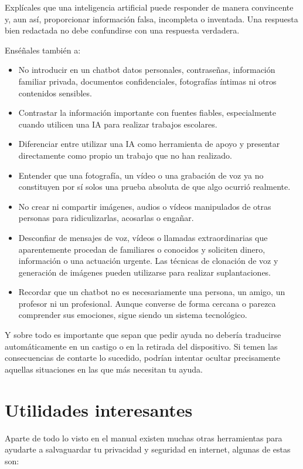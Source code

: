 \documentclass[
  spanish,
  a4paper,
  openany]{book}
\begin{document}
Explícales que una inteligencia artificial puede responder de manera convincente y, aun así, proporcionar información falsa, incompleta o inventada. Una respuesta bien redactada no debe confundirse con una respuesta verdadera.

Enséñales también a:

\begin{itemize}
\item
  No introducir en un chatbot datos personales, contraseñas, información familiar privada, documentos confidenciales, fotografías íntimas ni otros contenidos sensibles.
\item
  Contrastar la información importante con fuentes fiables, especialmente cuando utilicen una IA para realizar trabajos escolares.
\item
  Diferenciar entre utilizar una IA como herramienta de apoyo y presentar directamente como propio un trabajo que no han realizado.
\item
  Entender que una fotografía, un vídeo o una grabación de voz ya no constituyen por sí solos una prueba absoluta de que algo ocurrió realmente.
\item
  No crear ni compartir imágenes, audios o vídeos manipulados de otras personas para ridiculizarlas, acosarlas o engañar.
\item
  Desconfiar de mensajes de voz, vídeos o llamadas extraordinarias que aparentemente procedan de familiares o conocidos y soliciten dinero, información o una actuación urgente. Las técnicas de clonación de voz y generación de imágenes pueden utilizarse para realizar suplantaciones.
\item
  Recordar que un chatbot no es necesariamente una persona, un amigo, un profesor ni un profesional. Aunque converse de forma cercana o parezca comprender sus emociones, sigue siendo un sistema tecnológico.
\end{itemize}

Y sobre todo es importante que sepan que pedir ayuda no debería traducirse automáticamente en un castigo o en la retirada del dispositivo. Si temen las consecuencias de contarte lo sucedido, podrían intentar ocultar precisamente aquellas situaciones en las que más necesitan tu ayuda.

\section{Utilidades interesantes}\label{utilidades-interesantes}

Aparte de todo lo visto en el manual existen muchas otras herramientas para ayudarte a salvaguardar tu privacidad y seguridad en internet, algunas de estas son:
\end{document}
